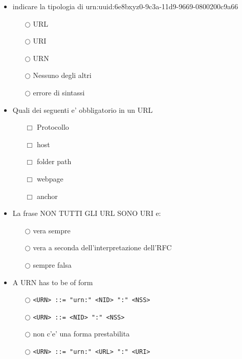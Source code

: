\documentclass[10pt,twocolumn]{article}
\begin{document}
\begin{itemize}
    \item indicare la tipologia di urn:uuid:6e8bxyz0-9c3a-11d9-9669-0800200c9a66
          \begin{itemize}
              \item[$\bigcirc$] URL
              \item[$\bigcirc$] URI
              \item[$\bigcirc$] URN
              \item[$\bigcirc$] Nessuno degli altri
              \item[$\bigcirc$] errore di sintassi
          \end{itemize}
\end{itemize}
\begin{itemize}
    \item Quali dei seguenti e' obbligatorio in un URL
          \begin{itemize}
              \item[$\Box$] Protocollo
              \item[$\Box$] host
              \item[$\Box$] folder path
              \item[$\Box$] webpage
              \item[$\Box$] anchor
          \end{itemize}
\end{itemize}
\begin{itemize}
    \item La frase NON TUTTI GLI URL SONO URI e:
          \begin{itemize}
              \item[$\bigcirc$] vera sempre
              \item[$\bigcirc$] vera a seconda dell'interpretazione dell'RFC
              \item[$\bigcirc$] sempre falsa
          \end{itemize}
\end{itemize}
\begin{itemize}
    \item A URN has to be of form
          \begin{itemize}
              \item[$\bigcirc$]\verb_<URN> ::= "urn:" <NID> ":" <NSS>_
              \item[$\bigcirc$]\verb_<URN> ::= <NID> ":" <NSS>_
              \item[$\bigcirc$] non c'e' una forma prestabilita
              \item[$\bigcirc$]\verb_<URN> ::= "urn:" <URL> ":" <URI>_
          \end{itemize}
\end{itemize}
\end{document}
